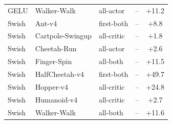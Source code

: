 \begin{table}[t]
\begin{tabular}{lllcc}
GELU & Walker-Walk & all-actor & -- & +11.2 \\
Swish & Ant-v4 & first-both & -- & +8.8 \\
Swish & Cartpole-Swingup & all-critic & -- & +1.8 \\
Swish & Cheetah-Run & all-actor & -- & +2.6 \\
Swish & Finger-Spin & all-both & -- & +11.5 \\
Swish & HalfCheetah-v4 & first-both & -- & +49.7 \\
Swish & Hopper-v4 & all-critic & -- & +24.8 \\
Swish & Humanoid-v4 & all-critic & -- & +2.7 \\
Swish & Walker-Walk & all-both & -- & +11.6 \\
\bottomrule
\end{tabular}
\end{table}
